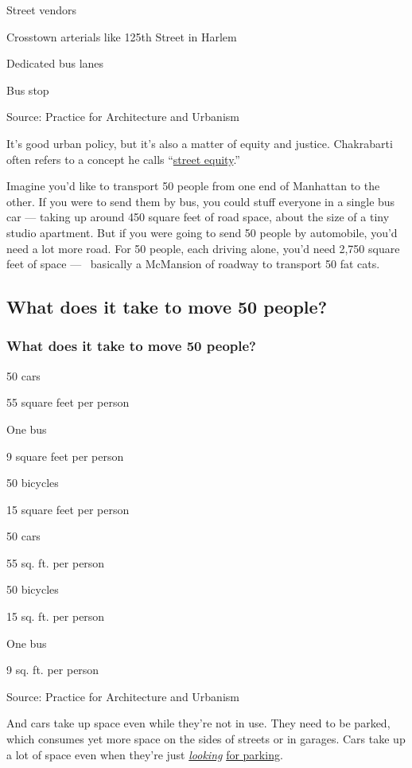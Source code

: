 Street vendors

Crosstown arterials like 125th Street in Harlem

Dedicated bus lanes

Bus stop

Source: Practice for Architecture and Urbanism

It's good urban policy, but it's also a matter of equity and justice.
Chakrabarti often refers to a concept he calls
``\href{https://twitter.com/vishaannyca/status/1180833269367136264}{street
equity}.''

Imagine you'd like to transport 50 people from one end of Manhattan to
the other. If you were to send them by bus, you could stuff everyone in
a single bus car --- taking up around 450 square feet of road space,
about the size of a tiny studio apartment. But if you were going to send
50 people by automobile, you'd need a lot more road. For 50 people, each
driving alone, you'd need 2,750 square feet of space ---~ basically a
McMansion of roadway to transport 50 fat cats.

\hypertarget{what-does-it-take-to-move-50-people}{%
\subsection{What does it take to move 50
people?}\label{what-does-it-take-to-move-50-people}}

\hypertarget{what-does-it-take-to-move-50-people-1}{%
\subsubsection{What does it take to move 50
people?}\label{what-does-it-take-to-move-50-people-1}}

50 cars

55 square feet per person

One bus

9 square feet per person

50 bicycles

15 square feet per person

50 cars

55 sq. ft. per person

50 bicycles

15 sq. ft. per person

One bus

9 sq. ft. per person

Source: Practice for Architecture and Urbanism

And cars take up space even while they're not in use. They need to be
parked, which consumes yet more space on the sides of streets or in
garages. Cars take up a lot of space even when they're just
\href{http://shoup.luskin.ucla.edu/wp-content/uploads/sites/2/2015/02/CruisingForParkingAccess.pdf}{}
\href{http://shoup.luskin.ucla.edu/wp-content/uploads/sites/2/2015/02/CruisingForParkingAccess.pdf}{\emph{looking}}
\href{http://shoup.luskin.ucla.edu/wp-content/uploads/sites/2/2015/02/CruisingForParkingAccess.pdf}{for
parking}.

